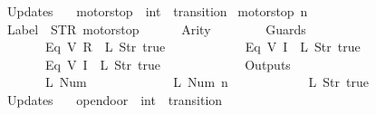\begin{isabellebody}
\ \ \ \ \ \ Updates\ {\isacharequal}\ {\isacharbrackleft}{\isacharbrackright}\isanewline
{\isasymrparr}{\isachardoublequoteclose}\isanewline
\isanewline
{}\isamarkupfalse%
\ motorstop\ {\isacharcolon}{\isacharcolon}\ {\isachardoublequoteopen}int\ {\isasymRightarrow}\ transition{\isachardoublequoteclose}\ \isanewline
{\isachardoublequoteopen}motorstop\ n\ {\isasymequiv}\ {\isasymlparr}\isanewline
\ \ \ \ \ \ Label\ {\isacharequal}\ STR\ {\isacharprime}{\isacharprime}motorstop{\isacharprime}{\isacharprime}{\isacharcomma}\isanewline
\ \ \ \ \ \ Arity\ {\isacharequal}\ {}{\isacharcomma}\isanewline
\ \ \ \ \ \ Guards\ {\isacharequal}\ {\isacharbrackleft}\isanewline
\ \ \ \ \ \ \ \ \ \ \ \ {\isacharparenleft}Eq\ {\isacharparenleft}V\ {\isacharparenleft}R\ {}{\isacharparenright}{\isacharparenright}\ {\isacharparenleft}L\ {\isacharparenleft}Str\ {\isacharprime}{\isacharprime}true{\isacharprime}{\isacharprime}{\isacharparenright}{\isacharparenright}{\isacharparenright}{\isacharcomma}\isanewline
\ \ \ \ \ \ \ \ \ \ \ \ {\isacharparenleft}Eq\ {\isacharparenleft}V\ {\isacharparenleft}I\ {}{\isacharparenright}{\isacharparenright}\ {\isacharparenleft}L\ {\isacharparenleft}Str\ {\isacharprime}{\isacharprime}true{\isacharprime}{\isacharprime}{\isacharparenright}{\isacharparenright}{\isacharparenright}{\isacharcomma}\isanewline
\ \ \ \ \ \ \ \ \ \ \ \ {\isacharparenleft}Eq\ {\isacharparenleft}V\ {\isacharparenleft}I\ {}{\isacharparenright}{\isacharparenright}\ {\isacharparenleft}L\ {\isacharparenleft}Str\ {\isacharprime}{\isacharprime}true{\isacharprime}{\isacharprime}{\isacharparenright}{\isacharparenright}{\isacharparenright}\isanewline
\ \ \ \ \ \ {\isacharbrackright}{\isacharcomma}\isanewline
\ \ \ \ \ \ Outputs\ {\isacharequal}\ {\isacharbrackleft}\isanewline
\ \ \ \ \ \ \ \ \ \ \ \ {\isacharparenleft}L\ {\isacharparenleft}Num\ {}{\isacharparenright}{\isacharparenright}{\isacharcomma}\isanewline
\ \ \ \ \ \ \ \ \ \ \ \ {\isacharparenleft}L\ {\isacharparenleft}Num\ n{\isacharparenright}{\isacharparenright}{\isacharcomma}\isanewline
\ \ \ \ \ \ \ \ \ \ \ \ {\isacharparenleft}L\ {\isacharparenleft}Str\ {\isacharprime}{\isacharprime}true{\isacharprime}{\isacharprime}{\isacharparenright}{\isacharparenright}\isanewline
\ \ \ \ \ \ {\isacharbrackright}{\isacharcomma}\isanewline
\ \ \ \ \ \ Updates\ {\isacharequal}\ {\isacharbrackleft}{\isacharbrackright}\isanewline
{\isasymrparr}{\isachardoublequoteclose}\isanewline
\isanewline
{}\isamarkupfalse%
\ opendoor\ {\isacharcolon}{\isacharcolon}\ {\isachardoublequoteopen}int\ {\isasymRightarrow}\ transition{\isachardoublequoteclose}\ \isanewline

\end{isabellebody}
